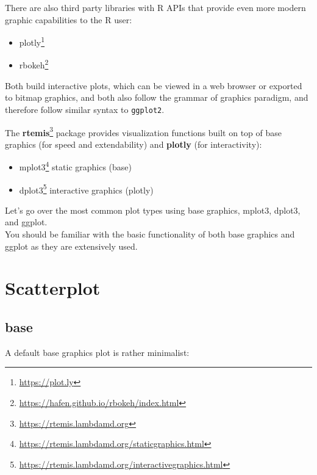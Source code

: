 \documentclass[
]{book}
\newenvironment{Shaded}{\begin{snugshade}}{\end{snugshade}}
\newcommand{\FunctionTok}[1]{\textcolor[rgb]{0.00,0.00,0.00}{#1}}
\newcommand{\NormalTok}[1]{#1}
\newcommand{\SpecialCharTok}[1]{\textcolor[rgb]{0.00,0.00,0.00}{#1}}
\DeclareRobustCommand{\href}[2]{#2\footnote{\url{#1}}}
\providecommand{\tightlist}{%
  \setlength{\itemsep}{0pt}\setlength{\parskip}{0pt}}
\renewcommand{\href}[2]{#2\footnote{\url{#1}}}
\begin{document}
There are also third party libraries with R APIs that provide even more modern graphic capabilities to the R user:

\begin{itemize}
\tightlist
\item
  \href{https://plot.ly}{plotly} \citep{sievert2017plotly}
\item
  \href{https://hafen.github.io/rbokeh/index.html}{rbokeh}
\end{itemize}

Both build interactive plots, which can be viewed in a web browser or exported to bitmap graphics, and both also follow the grammar of graphics paradigm, and therefore follow similar syntax to \texttt{ggplot2}.

The \href{https://rtemis.lambdamd.org}{\textbf{rtemis}} package \citep{gennatas2017towards} provides visualization functions built on top of base graphics (for speed and extendability) and \textbf{plotly} (for interactivity):

\begin{itemize}
\tightlist
\item
  \href{https://rtemis.lambdamd.org/staticgraphics.html}{mplot3} static graphics (base)
\item
  \href{https://rtemis.lambdamd.org/interactivegraphics.html}{dplot3} interactive graphics (plotly)
\end{itemize}

Let's go over the most common plot types using base graphics, mplot3, dplot3, and ggplot.\\
You should be familiar with the basic functionality of both base graphics and ggplot as they are extensively used.

\hypertarget{scatterplot}{%
\section{Scatterplot}\label{scatterplot}}

\hypertarget{base-2}{%
\subsection{base}\label{base-2}}

A default base graphics plot is rather minimalist:

\begin{Shaded}
\end{Shaded}
\end{document}
